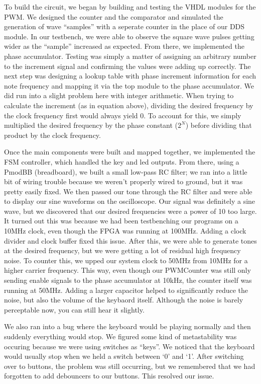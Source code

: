 \documentclass{article}
\begin{document}
    To build the circuit, we began by building and testing the VHDL modules for the PWM. We designed the counter and the comparator and simulated the generation of wave ``samples'' with a seperate counter in the place of our DDS module. In our testbench, we were able to observe the square wave pulses getting wider as the ``sample'' increased as expected. From there, we implemented the phase accumulator. Testing was simply a matter of assigning an arbitrary number to the increment signal and confirming the values were adding up correctly. The next step was designing a lookup table with phase increment information for each note frequency and mapping it via the top module to the phase accumulator. We did run into a slight problem here with integer arithmetic. When trying to calculate the increment (as in equation above), dividing the desired frequency by the clock frequency first would always yield 0. To account for this, we simply multiplied the desired frequency by the phase constant ($2^N$) before dividing that product by the clock frequency.

    Once the main components were built and mapped together, we implemented the FSM controller, which handled the key and led outputs. From there, using a PmodBB (breadboard), we built a small low-pass RC filter; we ran into a little bit of wiring trouble because we weren't properly wired to ground, but it was pretty easily fixed. We then passed our tone through the RC filter and were able to display our sine waveforms on the oscilloscope. Our signal was definitely a sine wave, but we discovered that our desired frequencies were a power of 10 too large. It turned out this was because we had been testbenching our programs on a 10MHz clock, even though the FPGA was running at 100MHz. Adding a clock divider and clock buffer fixed this issue. After this, we were able to generate tones at the desired frequency, but we were getting a lot of residual high frequency noise. To counter this, we upped our system clock to 50MHz from 10MHz for a higher carrier frequency. This way, even though our PWMCounter was still only sending enable signals to the phase accumulator at 10kHz, the counter itself was running at 50MHz. Adding a larger capacitor helped to significantly reduce the noise, but also the volume of the keybaord itself. Although the noise is barely perceptable now, you can still hear it slightly.

    We also ran into a bug where the keyboard would be playing normally and then suddenly everything would stop. We figured some kind of metastability was occuring because we were using switches as ``keys''. We noticed that the keyboard would usually stop when we held a switch between `0' and `1'. After switching over to buttons, the problem was still occurring, but we remembered that we had forgotten to add debouncers to our buttons. This resolved our issue. 
\end{document}
